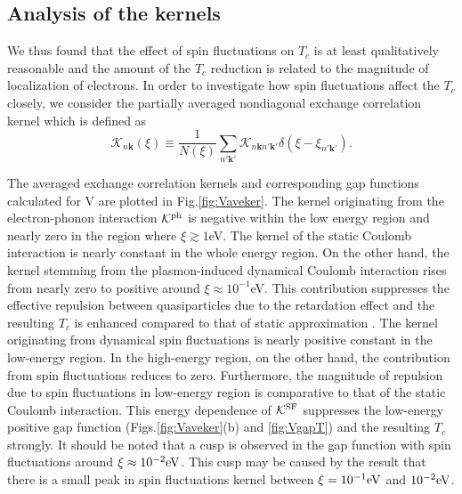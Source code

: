 \subsection{Analysis of the kernels}
We thus found that the effect of spin fluctuations on $T_c$ is at least qualitatively reasonable and 
the amount of the $T_c$ reduction is related to the magnitude of localization of electrons.
In order to investigate how spin fluctuations affect the $T_c$ closely, we 
consider the partially averaged nondiagonal exchange correlation kernel which is defined as
%
\begin{equation}
	\mathcal K_{n\bm k}(\xi) \equiv \frac{1}{N(\xi)}
	\sum_{n'\bm k'} \mathcal K_{n\bm k n'\bm k'}\delta(\xi - \xi_{n'\bm k'}).
	\label{eq:aveK}
\end{equation}
%

The averaged exchange correlation kernels and corresponding gap functions calculated for V 
are plotted in Fig.\ref{fig:Vaveker}. The kernel originating from the electron-phonon interaction
$\mathcal K^{\rm ph}$ is negative within the low energy region and nearly zero in the region 
where $\xi \gtrsim 1$eV. The kernel of the static Coulomb interaction is nearly constant in the
whole energy region. On the other hand, the kernel stemming from the plasmon-induced dynamical
Coulomb interaction rises from nearly zero to positive around $\xi \approx 10^{-1}$eV.
This contribution suppresses the effective repulsion between quasiparticles due to the 
retardation effect and the resulting $T_c$ is enhanced compared to that of static approximation
\cite{RA2013}.
The kernel originating from dynamical spin fluctuations is nearly positive constant in the low-energy
region. In the high-energy region, on the other hand, the contribution from spin fluctuations 
reduces to zero. 
Furthermore, the magnitude of repulsion due to spin fluctuations in low-energy region is comparative 
to that of the static Coulomb interaction. This energy dependence of
$\mathcal K^{\rm SF}$ suppresses the low-energy positive gap function (Figs.\ref{fig:Vaveker}(b)
and \ref{fig:VgapT}) and
the resulting $T_c$ strongly.
It should be noted that a cusp is observed in the gap function with spin fluctuations 
around $\xi \approx 10^{-2}{\rm eV}$. This cusp may be caused by the result 
that there is a small
peak in spin fluctuations kernel between $\xi = 10^{-1}{\rm eV}$ and $10^{-2}{\rm eV}$.

